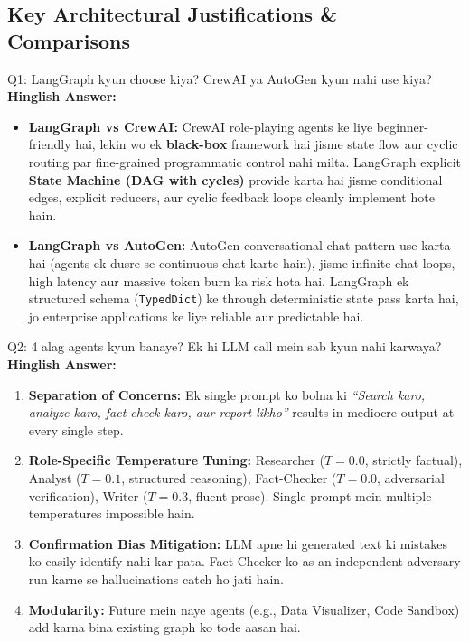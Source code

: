 \documentclass[9.5pt, a4paper]{article}
\begin{document}
\subsection{Key Architectural Justifications \& Comparisons}

\begin{interviewbox}{Q1: LangGraph kyun choose kiya? CrewAI ya AutoGen kyun nahi use kiya?}
\textbf{Hinglish Answer:}
\begin{itemize}
    \item \textbf{LangGraph vs CrewAI:} CrewAI role-playing agents ke liye beginner-friendly hai, lekin wo ek \textbf{black-box} framework hai jisme state flow aur cyclic routing par fine-grained programmatic control nahi milta. LangGraph explicit \textbf{State Machine (DAG with cycles)} provide karta hai jisme conditional edges, explicit reducers, aur cyclic feedback loops cleanly implement hote hain.
    \item \textbf{LangGraph vs AutoGen:} AutoGen conversational chat pattern use karta hai (agents ek dusre se continuous chat karte hain), jisme infinite chat loops, high latency aur massive token burn ka risk hota hai. LangGraph ek structured schema (\texttt{TypedDict}) ke through deterministic state pass karta hai, jo enterprise applications ke liye reliable aur predictable hai.
\end{itemize}
\end{interviewbox}

\begin{interviewbox}{Q2: 4 alag agents kyun banaye? Ek hi LLM call mein sab kyun nahi karwaya?}
\textbf{Hinglish Answer:}
\begin{enumerate}
    \item \textbf{Separation of Concerns:} Ek single prompt ko bolna ki \textit{``Search karo, analyze karo, fact-check karo, aur report likho''} results in mediocre output at every single step.
    \item \textbf{Role-Specific Temperature Tuning:} Researcher ($T=0.0$, strictly factual), Analyst ($T=0.1$, structured reasoning), Fact-Checker ($T=0.0$, adversarial verification), Writer ($T=0.3$, fluent prose). Single prompt mein multiple temperatures impossible hain.
    \item \textbf{Confirmation Bias Mitigation:} LLM apne hi generated text ki mistakes ko easily identify nahi kar pata. Fact-Checker ko as an independent adversary run karne se hallucinations catch ho jati hain.
    \item \textbf{Modularity:} Future mein naye agents (e.g., Data Visualizer, Code Sandbox) add karna bina existing graph ko tode aasan hai.
\end{enumerate}
\end{interviewbox}
\end{document}
